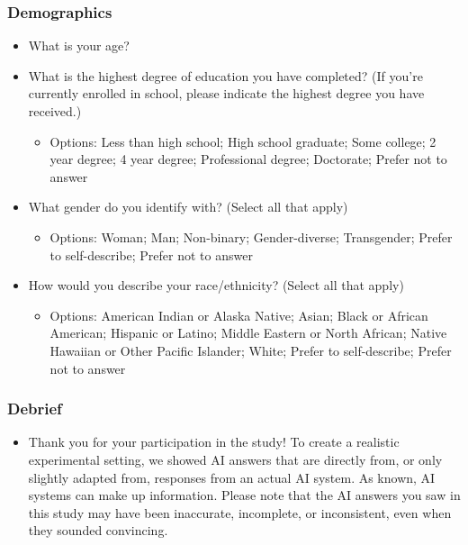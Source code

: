 \subsubsection*{Demographics}
\begin{itemize}
    \item What is your age? 
    \item What is the highest degree of education you have completed? (If you’re currently enrolled in school, please indicate the highest degree you have received.)
    \begin{itemize}
        \item Options: Less than high school; High school graduate; Some college; 2 year degree; 4 year degree; Professional degree; Doctorate; Prefer not to answer
    \end{itemize}
    \item What gender do you identify with? (Select all that apply)
    \begin{itemize}
        \item Options: Woman; Man; Non-binary; Gender-diverse; Transgender; Prefer to self-describe; Prefer not to answer
    \end{itemize}
    \item How would you describe your race/ethnicity? (Select all that apply) 
   \begin{itemize}
       \item Options: American Indian or Alaska Native; Asian; Black or African American; Hispanic or Latino; Middle Eastern or North African; Native Hawaiian or Other Pacific Islander; White; Prefer to self-describe; Prefer not to answer
   \end{itemize}
\end{itemize}


\subsubsection*{Debrief}
\begin{itemize}
    \item Thank you for your participation in the study! To create a realistic experimental setting, we showed AI answers that are directly from, or only slightly adapted from, responses from an actual AI system. As known, AI systems can make up information. Please note that the AI answers you saw in this study may have been inaccurate, incomplete, or inconsistent, even when they sounded convincing. 
\end{itemize}



